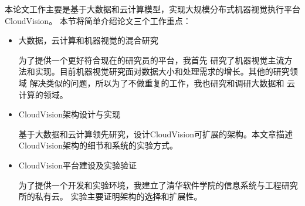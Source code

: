 本论文工作主要是基于大数据和云计算模型，实现大规模分布式机器视觉执行平台CloudVision。
本节将简单介绍论文三个工作重点：
\begin{itemize}
  \item 大数据，云计算和机器视觉的混合研究

        为了提供一个更好符合现在的研究员的平台，我首先
        研究了机器视觉主流方法和实现。目前机器视觉研究面对数据大小和处理需求的增长。其他的研究领域
        解决类似的问题，所以为了不做重复的工作，我也研究和调研大数据和
        云计算的领域。

  \item CloudVision架构设计与实现

        基于大数据和云计算领先研究，设计CloudVision可扩展的架构。本文章描述
        CloudVision架构的细节和系统的实验方式。

  \item CloudVision平台建设及实验验证

        为了提供一个开发和实验环境，我建立了清华软件学院的信息系统与工程研究所的私有云。
        实验主要证明架构的选择和扩展性。

\end{itemize}


